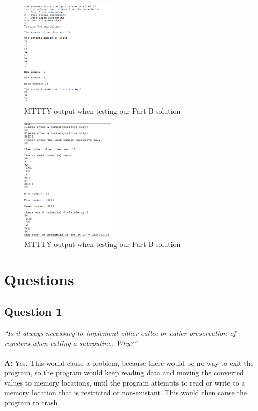 \documentclass[letterpaper]{article}
\begin{document}
      \begin{figure}[H]
        \centering
        \includegraphics[width=0.4\textwidth]{partc.jpg}
        \caption{MTTTY output when testing our Part B solution}
      \end{figure}

      \begin{figure}[H]
        \centering
        \includegraphics[width=0.4\textwidth]{allparts.jpg}
        \caption{MTTTY output when testing our Part B solution}
      \end{figure}

\section{Questions}

    \subsection{Question 1}
      \textit{``Is it always necessary to implement either callee or caller preservation of registers when calling a subroutine. Why?''}
      \\ \\
      \noindent\textbf{A:}
      Yes. This would cause a problem, because there would be no way to exit the program,
      so the program would keep reading data and moving the converted values to
      memory locations, until the program attempts to read or write to a memory
      location that is restricted or non-existant. This would then cause the
      program to crash.
\end{document}
